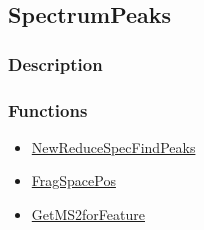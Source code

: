 \subsection{SpectrumPeaks}\label{SpectrumPeaks}
\subsubsection{Description}


\subsubsection{Functions}
\begin{itemize}
\item \hyperref[NewReduceSpecFindPeaks]{NewReduceSpecFindPeaks}
\item \hyperref[FragSpacePos]{FragSpacePos}
\item \hyperref[GetMS2forFeature]{GetMS2forFeature}
\end{itemize}

